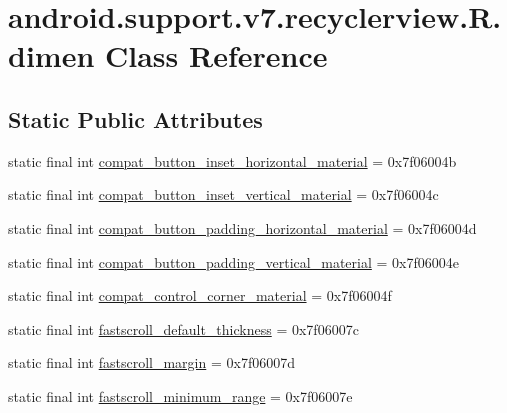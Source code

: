 \hypertarget{classandroid_1_1support_1_1v7_1_1recyclerview_1_1_r_1_1dimen}{}\section{android.\+support.\+v7.\+recyclerview.\+R.\+dimen Class Reference}
\label{classandroid_1_1support_1_1v7_1_1recyclerview_1_1_r_1_1dimen}
\subsection*{Static Public Attributes}
\begin{DoxyCompactItemize}
\item 
static final int \mbox{\hyperlink{classandroid_1_1support_1_1v7_1_1recyclerview_1_1_r_1_1dimen_a242057186bc8580665bf783a2675ee16}{compat\+\_\+button\+\_\+inset\+\_\+horizontal\+\_\+material}} = 0x7f06004b
\item 
static final int \mbox{\hyperlink{classandroid_1_1support_1_1v7_1_1recyclerview_1_1_r_1_1dimen_af6caf09e4e348978fd7154fb932179fb}{compat\+\_\+button\+\_\+inset\+\_\+vertical\+\_\+material}} = 0x7f06004c
\item 
static final int \mbox{\hyperlink{classandroid_1_1support_1_1v7_1_1recyclerview_1_1_r_1_1dimen_a43e5d15da88fb29ec52e9a3d1ab113a0}{compat\+\_\+button\+\_\+padding\+\_\+horizontal\+\_\+material}} = 0x7f06004d
\item 
static final int \mbox{\hyperlink{classandroid_1_1support_1_1v7_1_1recyclerview_1_1_r_1_1dimen_ae169af4665af04304ea29edbf7cf2203}{compat\+\_\+button\+\_\+padding\+\_\+vertical\+\_\+material}} = 0x7f06004e
\item 
static final int \mbox{\hyperlink{classandroid_1_1support_1_1v7_1_1recyclerview_1_1_r_1_1dimen_a76bc121038af3011a668454c65779de0}{compat\+\_\+control\+\_\+corner\+\_\+material}} = 0x7f06004f
\item 
static final int \mbox{\hyperlink{classandroid_1_1support_1_1v7_1_1recyclerview_1_1_r_1_1dimen_a85f67c45c2a8415cc540f4aab28693fe}{fastscroll\+\_\+default\+\_\+thickness}} = 0x7f06007c
\item 
static final int \mbox{\hyperlink{classandroid_1_1support_1_1v7_1_1recyclerview_1_1_r_1_1dimen_af1adda40f7e92e9ad3ed9b8af59b9ad7}{fastscroll\+\_\+margin}} = 0x7f06007d
\item 
static final int \mbox{\hyperlink{classandroid_1_1support_1_1v7_1_1recyclerview_1_1_r_1_1dimen_af0f89a5e5f3dd7abaf4f4b903528e54a}{fastscroll\+\_\+minimum\+\_\+range}} = 0x7f06007e

\end{DoxyCompactItemize}
